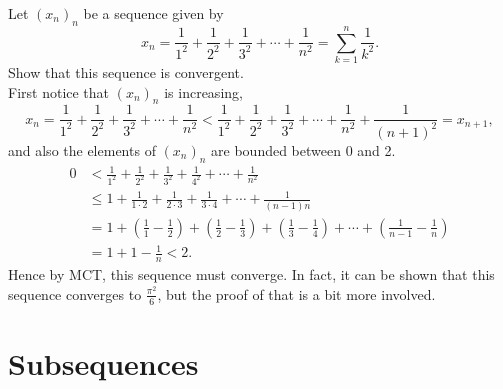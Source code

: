 \documentclass[../real_analysis.tex]{subfiles}
\begin{document}
        \begin{example}
            Let $(x_n)_n$ be a sequence given by
            \begin{equation*}
                x_n=\frac{1}{1^2}+\frac{1}{2^2}+\frac{1}{3^2}+\cdots+\frac{1}{n^2}=\sum_{k=1}^n\frac{1}{k^2}.
            \end{equation*}
            Show that this sequence is convergent.\\
            First notice that $(x_n)_n$ is increasing,
            \begin{equation*}
                x_n=\frac{1}{1^2}+\frac{1}{2^2}+\frac{1}{3^2}+\cdots+\frac{1}{n^2}<\frac{1}{1^2}+\frac{1}{2^2}+\frac{1}{3^2}+\cdots+\frac{1}{n^2}+\frac{1}{(n+1)^2}=x_{n+1},
            \end{equation*}
            and also the elements of $(x_n)_n$ are bounded between 0 and 2.
            \begin{align*}
                0&<\frac{1}{1^2}+\frac{1}{2^2}+\frac{1}{3^2}+\frac{1}{4^2}+\cdots+\frac{1}{n^2}\\
                &\leq1+\frac{1}{1\cdot2}+\frac{1}{2\cdot3}+\frac{1}{3\cdot4}+\cdots+\frac{1}{(n-1)n}\\
                &=1+\left(\frac{1}{1}-\frac{1}{2}\right)+\left(\frac{1}{2}-\frac{1}{3}\right)+\left(\frac{1}{3}-\frac{1}{4}\right)+\cdots+\left(\frac{1}{n-1}-\frac{1}{n}\right)\\
                &=1+1-\frac{1}{n}<2.
            \end{align*}
            Hence by MCT, this sequence must converge.
            In fact, it can be shown that this sequence converges to $\frac{\pi^2}{6}$, but the proof of that is a bit more involved.
        \end{example}

    \section{Subsequences}
\end{document}
